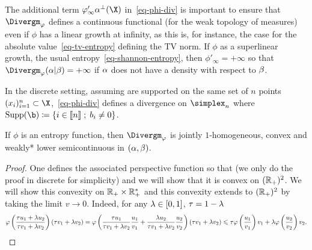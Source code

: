 The additional term $\phi'_\infty \al^{\perp}(\X)$ in~\eqref{eq-phi-div} is important to ensure that $\Divergm_\phi$ defines a continuous functional (for the weak topology of measures) even if $\phi$ has a linear growth at infinity, as this is, for instance, the case for the absolute value~\eqref{eq-tv-entropy} defining the TV norm. If $\phi$ as a superlinear growth, \eg the usual entropy~\eqref{eq-shannon-entropy}, then $\phi'_\infty=+\infty$ so that $\Divergm_\phi (\al|\be) = +\infty$ if $\alpha$ does not have a density with respect to $\beta$. 

In the discrete setting, assuming 
are supported on the same set of $n$ points $(x_i)_{i=1}^n \subset \X$,~\eqref{eq-phi-div} defines a divergence on $\simplex_n$
where $\Supp(\b) \eqdef \enscond{i \in \range{n}}{ b_i \neq 0 }$.


\begin{proposition}
If $\phi$ is an entropy function, then $\Divergm_\phi$ is jointly $1$-homogeneous, convex and weakly* lower semicontinuous in $(\alpha,\beta)$.
\end{proposition}

\begin{proof} 
	One defines the associated perspective function 
	so that (we only do the proof in discrete for simplicity)
	and we will show that it is convex on $(\mathbb{R}_+)^2$. We will show this convexity on $\mathbb{R}_+ \times \mathbb{R}_+^*$ and this convexity extends to $(\mathbb{R}_+)^2$ by taking the limit $v \rightarrow 0$.
	Indeed, for any $\lambda \in [0,1]$,  $\tau=1-\lambda$
	\begin{align*}
		\varphi\left(  \frac{\tau u_1 + \lambda u_2}{\tau v_1 + \lambda v_2}  \right)
		(\tau v_1 + \lambda v_2) 
		= 
		\varphi\left(  
			 	\frac{\tau u_1 }{\tau v_1 + \lambda v_2} \frac{u_1}{v_1}+
				\frac{\lambda u_2 }{\tau v_1 + \lambda v_2} \frac{u_2}{v_2}		
		 \right)
		(\tau v_1 + \lambda v_2)
		\leqslant 
		\tau \varphi\left( \frac{u_1}{v_1} \right) v_1 
		+ 
		\lambda \varphi\left( \frac{u_2}{v_2} \right) v_2 .
	\end{align*}
\end{proof} 

